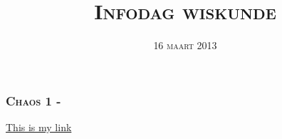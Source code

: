 \documentclass[aspectratio=1610]{beamer}
\title[]{{\scshape Infodag wiskunde}}
\date{{\scshape 16 maart 2013}}
\begin{document}
\begin{frame}
\titlepage
\end{frame}

\begin{frame}\label{chaosfrag1}\frametitle{{\scshape Chaos 1 - }}
\href{run:./beach.avi}{This is my link}
\end{frame}
\end{document}
